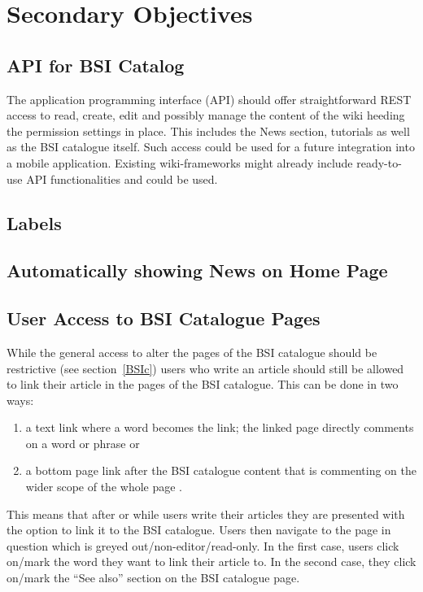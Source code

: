 \chapter{Secondary Objectives}
\section{API for BSI Catalog}
The application programming interface (API) should offer straightforward REST access to read, create, edit and possibly manage the content of the wiki heeding the permission settings in place.
This includes the News section, tutorials as well as the BSI catalogue itself.
Such access could be used for a future integration into a mobile application.
Existing wiki-frameworks might already include ready-to-use API functionalities and could be used.


\section{Labels}



\section{Automatically showing News on Home Page}



\section{User Access to BSI Catalogue Pages}
While the general access to alter the pages of the BSI catalogue should be restrictive (see section~\ref{BSIc}) users who write an article should still be allowed to link their article in the pages of the BSI catalogue.
This can be done in two ways:
\begin{enumerate}
    \item a text link where a word becomes the link; the linked page directly comments on a word or phrase or
    \item a bottom page link after the BSI catalogue content that is commenting on the wider scope of the whole page
        .
\end{enumerate}
This means that after or while users write their articles they are presented with the option to link it to the BSI catalogue.
Users then navigate to the page in question which is greyed out/non-editor/read-only.
In the first case, users click on/mark the word they want to link their article to.
In the second case, they click on/mark the ``See also'' section on the BSI catalogue page.


